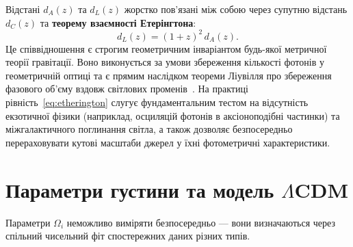 Відстані $d_A(z)$ та $d_L(z)$ жорстко пов'язані між собою через супутню відстань $d_C(z)$ та \textbf{теорему взаємності Етерінгтона}:
\begin{equation}\label{eq:etherington}
  d_L(z) = (1+z)^2\, d_A(z).
\end{equation}
Це співвідношення є строгим геометричним інваріантом будь-якої метричної теорії гравітації. Воно виконується за умови збереження кількості фотонів у геометричній оптиці та є прямим наслідком теореми Ліувілля про збереження фазового об'єму вздовж світлових променів~\cite{Baumann2022}. На практиці рівність~\eqref{eq:etherington} слугує фундаментальним тестом на відсутність екзотичної фізики (наприклад, осциляцій фотонів в аксіоноподібні частинки) та міжгалактичного поглинання світла, а також дозволяє безпосередньо перераховувати кутові масштаби джерел у їхні фотометричні характеристики.


\section{Параметри густини та модель $\Lambda$CDM }
\label{sec:lcdm_and_flatness}

Параметри $\Omega_i$ неможливо виміряти безпосередньо ---
вони визначаються через спільний чисельний фіт спостережних даних
різних типів.

